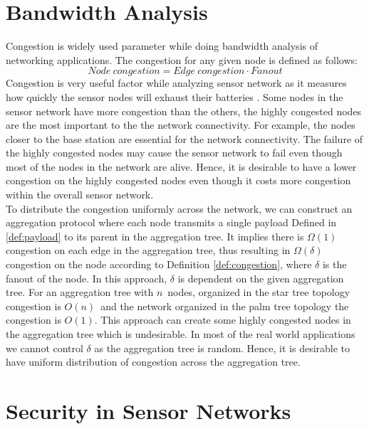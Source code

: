 \section{Bandwidth Analysis}
	Congestion is widely used parameter while doing bandwidth analysis of networking applications. 
	The congestion for any given node is defined as follows:
	\begin{equation}\label{def:congestion}
		Node\ congestion = Edge\ congestion \cdot Fanout
	\end{equation}
	Congestion is very useful factor while analyzing sensor network as it measures how quickly the sensor nodes will exhaust their batteries \cite{madden2003design}. 
	Some nodes in the sensor network have more congestion than the others, the highly congested nodes are the most important to the the network connectivity.
	For example, the nodes closer to the base station are essential for the network connectivity.
	The failure of the highly congested nodes may cause the sensor network to fail even though most of the nodes in the network are alive.
	Hence, it is desirable to have a lower congestion on the highly congested nodes even though it costs more congestion within the overall sensor network.\\
	To distribute the congestion uniformly across the network, we can construct an aggregation protocol where each node transmits a single payload Defined in \ref{def:payload} to its parent in the aggregation tree.
	It implies there is $\Omega(1)$ congestion on each edge in the aggregation tree, thus resulting in $\Omega(\delta)$ congestion on the node  according to Definition \ref{def:congestion}, where $\delta$ is the fanout of the node.
	In this approach, $\delta$ is dependent on the given aggregation tree.
	For an aggregation tree with $n$\ nodes, organized in the star tree topology congestion is $O(n)$\ and the network organized in the palm tree topology the congestion is $O(1)$.
	This approach can create some highly congested nodes in the aggregation tree which is undesirable.
	In most of the real world applications we cannot control $\delta$ as the aggregation tree is random.
	Hence, it is desirable to have uniform distribution of congestion across the aggregation tree.



\section{Security in Sensor Networks}
	\label{sec:aggregate-adversary}

